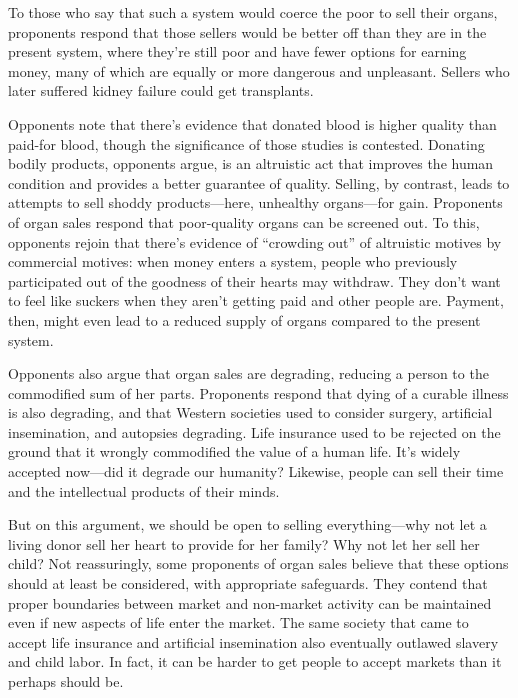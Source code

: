 To those who say that such a system would coerce the poor to sell their organs,
proponents respond that those sellers would be better off than they are in the
present system, where they're still poor and have fewer options for earning
money, many of which are equally or more dangerous and unpleasant.  Sellers who
later suffered kidney failure could get transplants.

Opponents note that there's evidence that donated blood is higher quality than
paid-for blood, though the significance of those studies is contested. 
Donating bodily products, opponents argue, is an altruistic act that improves
the human condition and provides a better guarantee of quality.  Selling, by
contrast, leads to attempts to sell shoddy products---here, unhealthy
organs---for gain.  Proponents of organ sales respond that poor-quality organs
can be
screened out.  To this, opponents rejoin that there's evidence of ``crowding
out'' of altruistic motives by commercial motives: when money enters a system,
people who previously participated out of the goodness of their hearts may
withdraw.  They don't want to feel like suckers when they aren't getting paid
and other people are.  Payment, then, might even lead to a reduced supply of
organs compared to the present system.

Opponents also argue that organ sales are degrading, reducing a person to the
commodified sum of her parts.  Proponents respond that dying of a curable
illness is also degrading, and that Western societies used to consider surgery,
artificial insemination, and autopsies degrading.  Life insurance used to be
rejected on the ground that it wrongly commodified the value of a human life. 
It's widely accepted now---did it degrade our humanity?  Likewise, people can
sell their time and the intellectual products of their minds.

But on this argument, we should be open to selling everything---why not let a
living donor sell her heart to provide for her family?  Why not let her sell
her child?  Not reassuringly, some proponents of organ sales believe that these
options should at least be considered, with appropriate safeguards.  They
contend that proper boundaries between market and non-market activity can be
maintained even if new aspects of life enter the market.  The same society that
came to accept life insurance and artificial insemination also eventually
outlawed slavery and child labor.  In fact, it can be harder to get people to
accept markets than it perhaps should be.  

